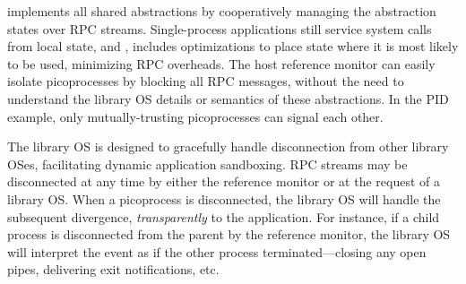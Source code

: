 \graphene{} implements all shared abstractions by cooperatively managing the abstraction states over RPC streams.
Single-process applications still service system calls from local state, and \graphene{}, includes optimizations to place state where it is most likely to be used, minimizing RPC overheads.
The host reference monitor can easily isolate picoprocesses by 
blocking all RPC messages, %
without the need to understand the library OS details or semantics of these abstractions.
In the PID example, only mutually-trusting picoprocesses can signal each other.



The \graphene{} library OS is designed to gracefully handle disconnection from other library OSes, facilitating dynamic application sandboxing.
RPC streams may be disconnected at any time by either the reference monitor or at the request of a library OS.
When a picoprocess is disconnected, the library OS will handle the subsequent
divergence, %
{\em transparently} to the application.
For instance, if a child process is disconnected from the parent by the reference monitor, the library OS will interpret the event as if the other process terminated---closing any open pipes, delivering exit notifications, etc.

